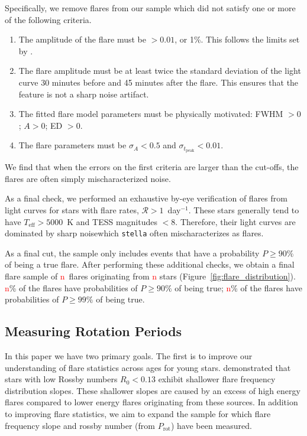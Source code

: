 \documentclass[twocolumn]{aastex631}
\begin{document}
Specifically, we remove flares from our sample which did not satisfy  one or more of the following criteria.
\begin{enumerate}
    \item  The amplitude of the flare must be $> 0.01$, or 1\%. This follows the limits set by \cite{feinstein20}.
    \item The flare amplitude  must be at least twice the standard deviation of the light curve 30 minutes before and 45 minutes after the flare. This ensures that the feature is not a sharp noise artifact.
    \item  The fitted flare model parameters must be physically motivated: FWHM $> 0$; $A > 0$; ED $> 0$.
    \item The flare parameters   must be $\sigma_A < 0.5$ and $\sigma_{t_\textrm{peak}} < 0.01$.
\end{enumerate}
We find that when the errors on the first criteria are larger than the cut-offs, the flares are often simply  mischaracterized noise.

As a final check, we performed an exhaustive by-eye verification of flares from light curves for stars with flare rates, $\mathcal{R} > 1$~day$^{-1}$. These stars  generally tend to have $T_\textrm{eff} > 5000$~K and TESS magnitudes $< 8$.  Therefore, their light curves are dominated by sharp noisewhich \texttt{stella} often mischaracterizes as flares.

As a final cut, the sample only includes events that have  a probability $P \geq 90\%$ of being
a true flare. After performing these additional checks, we obtain a final flare sample of \textcolor{red}{n}~flares originating from \textcolor{red}{n} stars (Figure~\ref{fig:flare_distribution}). \textcolor{red}{n}\% of the flares have probabilities of $P \geq 90\%$ of being true; \textcolor{red}{n}\% of the flares have probabilities of $P \geq 99\%$ of being true.

\subsection{Measuring Rotation Periods}\label{subsec:prot}
In this paper we have two  primary goals. The first is to improve our understanding of flare statistics across
 ages for young stars. \citet{seligman22} demonstrated that stars with low Rossby numbers $R_0 < 0.13$ exhibit
shallower flare frequency distribution slopes. These shallower slopes are caused by  an excess of  high energy flares compared to lower energy flares
originating from these sources.  In addition to improving flare statistics, we  aim to expand the sample for which flare frequency slope and  rossby number (from $P_\textrm{rot}$) have been measured.
\end{document}
